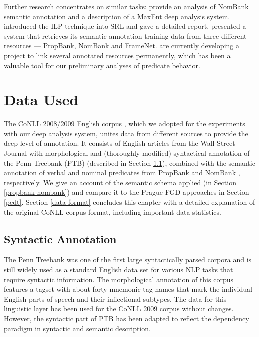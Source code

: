 \documentclass[12pt,notitlepage]{report}
\begin{document}
Further research concentrates on similar tasks: \citet{jiang06} provide an analysis of NomBank \citep{meyers04} semantic annotation and a description of a MaxEnt deep analysis system. \citet{punyakanok04} introduced the ILP technique into SRL and gave a detailed report. \citet{giuglea06} presented a system that retrieves its semantic annotation training data from three different resources --- PropBank, NomBank and FrameNet. \citet{loper07} are currently developing a project to link several annotated resources permanently, which has been a valuable tool for our preliminary analyses of predicate behavior. 

%
%
\chapter{Data Used}\label{data}
%
%

The CoNLL 2008/2009 English corpus \citep{surdeanu08,hajic09}, which we adopted for the experiments with our deep analysis system, unites data from different sources to provide the deep level of annotation. It consists of English articles from the Wall Street Journal with morphological and (thoroughly modified) syntactical annotation of the Penn Treebank (PTB) \citep{marcus93} (described in Section \ref{synt-annot}), combined with the semantic annotation of verbal and nominal predicates from PropBank \citep{palmer05} and NomBank \citep{meyers04}, respectively. We give an account of the semantic schema applied (in Section \ref{propbank-nombank}) and compare it to the Prague FGD approaches in Section \ref{pedt}. Section \ref{data-format} concludes this chapter with a detailed explanation of the original CoNLL corpus format, including important data statistics.

\section{Syntactic Annotation}\label{synt-annot}

The Penn Treebank was one of the first large syntactically parsed corpora and is still widely used as a standard English data set for various NLP tasks that require syntactic information. The morphological annotation of this corpus features a tagset \citep{santorini90} with about forty mnemonic tag names that mark the individual English parts of speech and their inflectional subtypes. The data for this linguistic layer has been used for the CoNLL 2009 corpus without changes. However, the syntactic part of PTB has been adapted to reflect the dependency paradigm in syntactic and semantic description.
\end{document}
